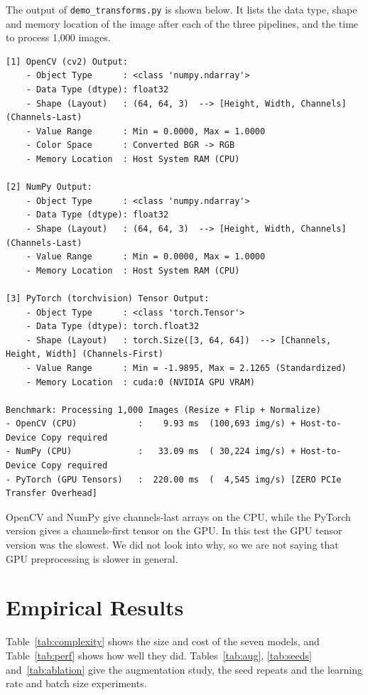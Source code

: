 \documentclass[12pt]{article}
\begin{document}
The output of \texttt{demo\_transforms.py} is shown below. It lists the data type, shape and memory location of the
image after each of the three pipelines, and the time to process 1{,}000 images.

\begin{lstlisting}[numbers=none,basicstyle=\ttfamily\scriptsize]
[1] OpenCV (cv2) Output:
    - Object Type      : <class 'numpy.ndarray'>
    - Data Type (dtype): float32
    - Shape (Layout)   : (64, 64, 3)  --> [Height, Width, Channels] (Channels-Last)
    - Value Range      : Min = 0.0000, Max = 1.0000
    - Color Space      : Converted BGR -> RGB
    - Memory Location  : Host System RAM (CPU)

[2] NumPy Output:
    - Object Type      : <class 'numpy.ndarray'>
    - Data Type (dtype): float32
    - Shape (Layout)   : (64, 64, 3)  --> [Height, Width, Channels] (Channels-Last)
    - Value Range      : Min = 0.0000, Max = 1.0000
    - Memory Location  : Host System RAM (CPU)

[3] PyTorch (torchvision) Tensor Output:
    - Object Type      : <class 'torch.Tensor'>
    - Data Type (dtype): torch.float32
    - Shape (Layout)   : torch.Size([3, 64, 64])  --> [Channels, Height, Width] (Channels-First)
    - Value Range      : Min = -1.9895, Max = 2.1265 (Standardized)
    - Memory Location  : cuda:0 (NVIDIA GPU VRAM)

Benchmark: Processing 1,000 Images (Resize + Flip + Normalize)
- OpenCV (CPU)            :    9.93 ms  (100,693 img/s) + Host-to-Device Copy required
- NumPy (CPU)             :   33.09 ms  ( 30,224 img/s) + Host-to-Device Copy required
- PyTorch (GPU Tensors)   :  220.00 ms  (  4,545 img/s) [ZERO PCIe Transfer Overhead]
\end{lstlisting}

OpenCV and NumPy give channels-last arrays on the CPU, while the PyTorch version gives a channels-first tensor on
the GPU. In this test the GPU tensor version was the slowest. We did not look into why, so we are not saying that
GPU preprocessing is slower in general.

\section{Empirical Results}

Table~\ref{tab:complexity} shows the size and cost of the seven models, and Table~\ref{tab:perf} shows how well they
did. Tables~\ref{tab:aug}, \ref{tab:seeds} and~\ref{tab:ablation} give the augmentation study, the seed repeats and the
learning rate and batch size experiments.
\end{document}
